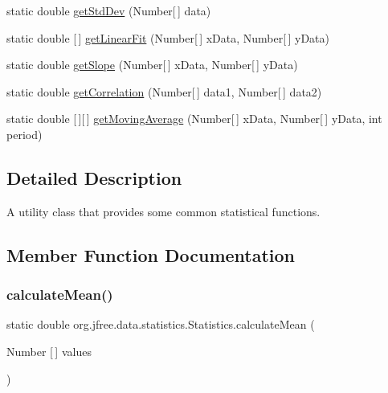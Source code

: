 \begin{DoxyCompactItemize}
static double \mbox{\hyperlink{classorg_1_1jfree_1_1data_1_1statistics_1_1_statistics_a44416f7f6ff7f62d4d41ef13e3d1863f}{get\+Std\+Dev}} (Number\mbox{[}$\,$\mbox{]} data)
\item 
static double \mbox{[}$\,$\mbox{]} \mbox{\hyperlink{classorg_1_1jfree_1_1data_1_1statistics_1_1_statistics_a710851304d13d6c83f0b6c799da5b94b}{get\+Linear\+Fit}} (Number\mbox{[}$\,$\mbox{]} x\+Data, Number\mbox{[}$\,$\mbox{]} y\+Data)
\item 
static double \mbox{\hyperlink{classorg_1_1jfree_1_1data_1_1statistics_1_1_statistics_a2a1d9b8f0980f6c98f8f90bbd7d95e28}{get\+Slope}} (Number\mbox{[}$\,$\mbox{]} x\+Data, Number\mbox{[}$\,$\mbox{]} y\+Data)
\item 
static double \mbox{\hyperlink{classorg_1_1jfree_1_1data_1_1statistics_1_1_statistics_ade3298593f093df2dcb1d051b418d261}{get\+Correlation}} (Number\mbox{[}$\,$\mbox{]} data1, Number\mbox{[}$\,$\mbox{]} data2)
\item 
static double \mbox{[}$\,$\mbox{]}\mbox{[}$\,$\mbox{]} \mbox{\hyperlink{classorg_1_1jfree_1_1data_1_1statistics_1_1_statistics_a0226b7b4d5998983761091e1c31e46e7}{get\+Moving\+Average}} (Number\mbox{[}$\,$\mbox{]} x\+Data, Number\mbox{[}$\,$\mbox{]} y\+Data, int period)
\end{DoxyCompactItemize}


\subsection{Detailed Description}
A utility class that provides some common statistical functions. 

\subsection{Member Function Documentation}
\mbox{\label{classorg_1_1jfree_1_1data_1_1statistics_1_1_statistics_a793d7b5028cb1856231d904d9ab169fd}} 
\subsubsection{\texorpdfstring{calculate\+Mean()}{calculateMean()}\hspace{0.1cm}{\footnotesize\ttfamily [1/4]}}
{\footnotesize\ttfamily static double org.\+jfree.\+data.\+statistics.\+Statistics.\+calculate\+Mean (\begin{DoxyParamCaption}\item[{Number \mbox{[}$\,$\mbox{]}}]{values }\end{DoxyParamCaption})\hspace{0.3cm}{\ttfamily [static]}}

